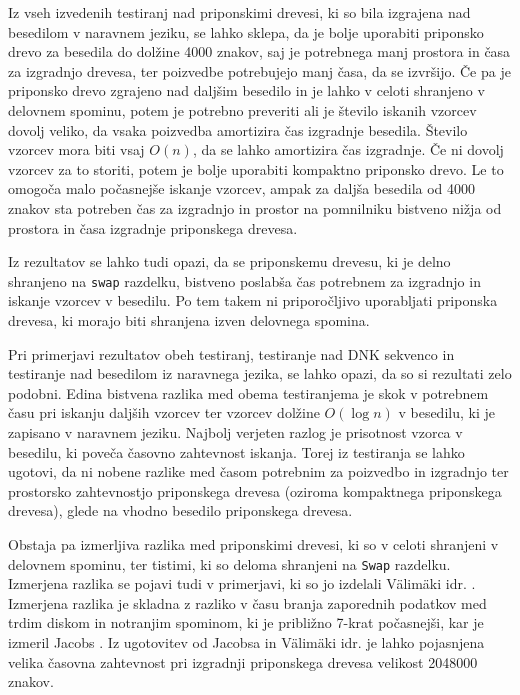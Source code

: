 Iz vseh izvedenih testiranj nad priponskimi drevesi, ki so bila izgrajena nad besedilom v naravnem jeziku, se lahko sklepa, da je bolje uporabiti priponsko drevo za besedila do dolžine 4000 znakov, saj je potrebnega manj prostora in časa za izgradnjo drevesa, ter poizvedbe potrebujejo manj časa, da se izvršijo. Če pa je priponsko drevo zgrajeno nad daljšim besedilo in je lahko v celoti shranjeno v delovnem spominu, potem je potrebno preveriti ali je število iskanih vzorcev dovolj veliko, da vsaka poizvedba amortizira čas izgradnje besedila. Število vzorcev mora biti vsaj $O(n)$, da se lahko amortizira čas izgradnje. Če ni dovolj vzorcev za to storiti, potem je bolje uporabiti kompaktno priponsko drevo. Le to omogoča malo počasnejše iskanje vzorcev, ampak za daljša besedila od 4000 znakov sta potreben čas za izgradnjo in prostor na pomnilniku bistveno nižja od prostora in časa izgradnje priponskega drevesa.

Iz rezultatov se lahko tudi opazi, da se priponskemu drevesu, ki je delno shranjeno na \verb|swap| razdelku, bistveno poslabša čas potrebnem za izgradnjo in iskanje vzorcev v besedilu. Po tem takem ni priporočljivo uporabljati priponska drevesa, ki morajo biti shranjena izven delovnega spomina.

Pri primerjavi rezultatov obeh testiranj, testiranje nad DNK sekvenco in testiranje nad besedilom iz naravnega jezika, se lahko opazi, da so si rezultati zelo podobni. Edina bistvena razlika med obema testiranjema je skok v potrebnem času pri iskanju daljših vzorcev ter vzorcev dolžine $O(\log{n})$ v besedilu, ki je zapisano v naravnem jeziku. Najbolj verjeten razlog je prisotnost vzorca v besedilu, ki poveča časovno zahtevnost iskanja. Torej iz testiranja se lahko ugotovi, da ni nobene razlike med časom potrebnim za poizvedbo in izgradnjo ter prostorsko zahtevnostjo priponskega drevesa (oziroma kompaktnega priponskega drevesa), glede na vhodno besedilo priponskega drevesa. 

Obstaja pa izmerljiva razlika med priponskimi drevesi, ki so v celoti shranjeni v delovnem spominu, ter tistimi, ki so deloma shranjeni na \verb|Swap| razdelku. Izmerjena razlika se  pojavi tudi v primerjavi, ki so jo izdelali Välimäki idr. \cite{Valimaki2007}. Izmerjena razlika je skladna z razliko v času branja zaporednih podatkov med trdim diskom in notranjim spominom, ki je približno 7-krat počasnejši, kar je izmeril Jacobs \cite{Jacobs2009}. Iz ugotovitev od Jacobsa \cite{Jacobs2009} in Välimäki idr. \cite{Valimaki2007} je lahko pojasnjena velika časovna zahtevnost pri izgradnji priponskega drevesa velikost 2048000 znakov.